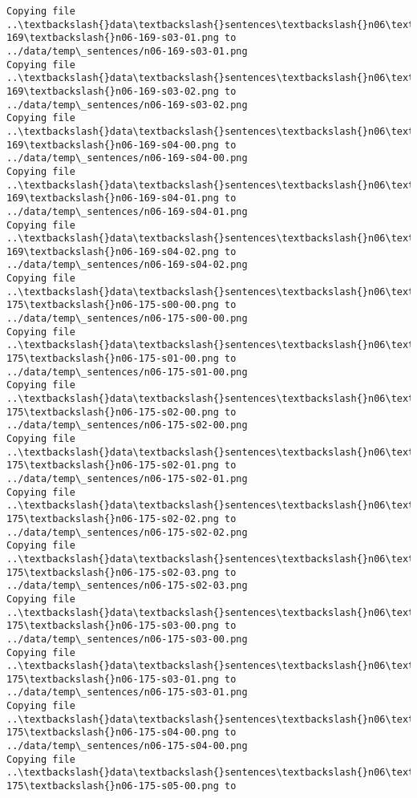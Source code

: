 \documentclass[11pt]{article}
\begin{document}
\begin{Verbatim}[commandchars=\\\{\}]
Copying file ..\textbackslash{}data\textbackslash{}sentences\textbackslash{}n06\textbackslash{}n06-169\textbackslash{}n06-169-s03-01.png to
../data/temp\_sentences/n06-169-s03-01.png
Copying file ..\textbackslash{}data\textbackslash{}sentences\textbackslash{}n06\textbackslash{}n06-169\textbackslash{}n06-169-s03-02.png to
../data/temp\_sentences/n06-169-s03-02.png
Copying file ..\textbackslash{}data\textbackslash{}sentences\textbackslash{}n06\textbackslash{}n06-169\textbackslash{}n06-169-s04-00.png to
../data/temp\_sentences/n06-169-s04-00.png
Copying file ..\textbackslash{}data\textbackslash{}sentences\textbackslash{}n06\textbackslash{}n06-169\textbackslash{}n06-169-s04-01.png to
../data/temp\_sentences/n06-169-s04-01.png
Copying file ..\textbackslash{}data\textbackslash{}sentences\textbackslash{}n06\textbackslash{}n06-169\textbackslash{}n06-169-s04-02.png to
../data/temp\_sentences/n06-169-s04-02.png
Copying file ..\textbackslash{}data\textbackslash{}sentences\textbackslash{}n06\textbackslash{}n06-175\textbackslash{}n06-175-s00-00.png to
../data/temp\_sentences/n06-175-s00-00.png
Copying file ..\textbackslash{}data\textbackslash{}sentences\textbackslash{}n06\textbackslash{}n06-175\textbackslash{}n06-175-s01-00.png to
../data/temp\_sentences/n06-175-s01-00.png
Copying file ..\textbackslash{}data\textbackslash{}sentences\textbackslash{}n06\textbackslash{}n06-175\textbackslash{}n06-175-s02-00.png to
../data/temp\_sentences/n06-175-s02-00.png
Copying file ..\textbackslash{}data\textbackslash{}sentences\textbackslash{}n06\textbackslash{}n06-175\textbackslash{}n06-175-s02-01.png to
../data/temp\_sentences/n06-175-s02-01.png
Copying file ..\textbackslash{}data\textbackslash{}sentences\textbackslash{}n06\textbackslash{}n06-175\textbackslash{}n06-175-s02-02.png to
../data/temp\_sentences/n06-175-s02-02.png
Copying file ..\textbackslash{}data\textbackslash{}sentences\textbackslash{}n06\textbackslash{}n06-175\textbackslash{}n06-175-s02-03.png to
../data/temp\_sentences/n06-175-s02-03.png
Copying file ..\textbackslash{}data\textbackslash{}sentences\textbackslash{}n06\textbackslash{}n06-175\textbackslash{}n06-175-s03-00.png to
../data/temp\_sentences/n06-175-s03-00.png
Copying file ..\textbackslash{}data\textbackslash{}sentences\textbackslash{}n06\textbackslash{}n06-175\textbackslash{}n06-175-s03-01.png to
../data/temp\_sentences/n06-175-s03-01.png
Copying file ..\textbackslash{}data\textbackslash{}sentences\textbackslash{}n06\textbackslash{}n06-175\textbackslash{}n06-175-s04-00.png to
../data/temp\_sentences/n06-175-s04-00.png
Copying file ..\textbackslash{}data\textbackslash{}sentences\textbackslash{}n06\textbackslash{}n06-175\textbackslash{}n06-175-s05-00.png to

\end{Verbatim}
\end{document}
